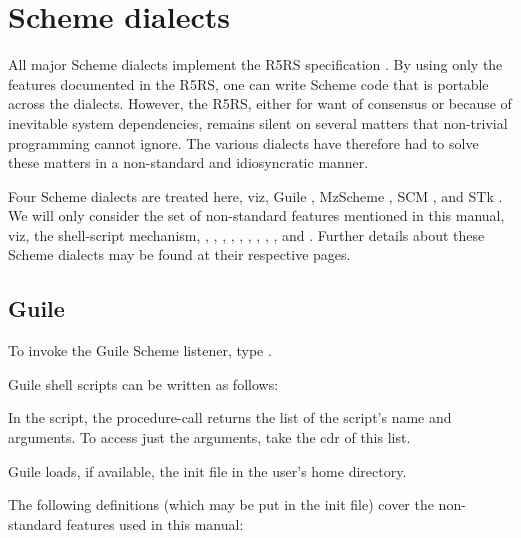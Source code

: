 \chapter{Scheme dialects}
\label{dialect}

All major Scheme dialects implement the R5RS
specification \cite{r5rs}.  By using only the features
documented in the R5RS, one can write Scheme code that
is portable across the dialects.  However, the R5RS,
either for want of consensus or because of inevitable
system dependencies, remains silent on several matters
that non-trivial programming cannot ignore.  The
various dialects have therefore had to solve these
matters in a non-standard and idiosyncratic manner.

Four Scheme dialects are treated here, viz, Guile
\cite{guile}, MzScheme \cite{mzscheme}, SCM
\cite{scm}, and STk \cite{stk}.  We will only
consider the set of non-standard features mentioned in
this manual, viz, the shell-script mechanism,
, ,
, , ,
, , , , and
.  Further details about these Scheme
dialects may be found at their respective pages.

\section{Guile}

To invoke the Guile Scheme listener,  type .

Guile shell scripts can be written as follows:


In the script, the procedure-call  returns
the list of the script's name and arguments.  To access
just the arguments, take the cdr of this list.

Guile loads, if available, the init file
 in the user's home directory.

The following definitions (which may be put in the init
file) cover the non-standard features used in this manual:

